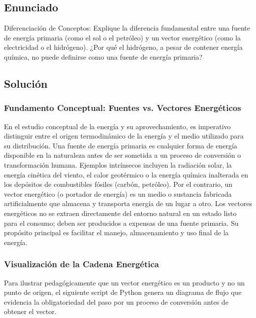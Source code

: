 \documentclass[12pt,a4paper]{article}
\begin{document}
\newpage

\subsection*{Enunciado}
Diferenciación de Conceptos: Explique la diferencia fundamental entre una fuente de energía primaria (como el sol o el petróleo) y un vector energético (como la electricidad o el hidrógeno). ¿Por qué el hidrógeno, a pesar de contener energía química, no puede definirse como una fuente de energía primaria?

\subsection*{Solución}

\subsubsection*{Fundamento Conceptual: Fuentes vs. Vectores Energéticos}
En el estudio conceptual de la energía y su aprovechamiento, es imperativo distinguir entre el origen termodinámico de la energía y el medio utilizado para su distribución. Una fuente de energía primaria es cualquier forma de energía disponible en la naturaleza antes de ser sometida a un proceso de conversión o transformación humana. Ejemplos intrínsecos incluyen la radiación solar, la energía cinética del viento, el calor geotérmico o la energía química inalterada en los depósitos de combustibles fósiles (carbón, petróleo). 
Por el contrario, un vector energético (o portador de energía) es un medio o sustancia fabricada artificialmente que almacena y transporta energía de un lugar a otro. Los vectores energéticos no se extraen directamente del entorno natural en un estado listo para el consumo; deben ser producidos a expensas de una fuente primaria. Su propósito principal es facilitar el manejo, almacenamiento y uso final de la energía.

\subsubsection*{Visualización de la Cadena Energética}
Para ilustrar pedagógicamente que un vector energético es un producto y no un punto de origen, el siguiente script de Python genera un diagrama de flujo que evidencia la obligatoriedad del paso por un proceso de conversión antes de obtener el vector.
\end{document}
